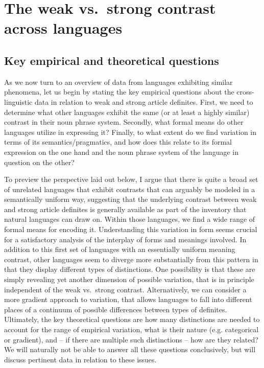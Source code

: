 \documentclass[output=paper
,modfonts
,nonflat]{langscibook}
\begin{document}
\section{The weak vs.\ strong contrast across languages}

\subsection{Key empirical and theoretical questions}

As we now turn to an overview of data from languages exhibiting
similar phenomena, let us begin by stating the key empirical questions
about the cross-linguistic data in relation to weak and strong article
definites. First, we need to determine what other languages exhibit
the same (or at least a highly similar) contrast in their noun phrase
system. Secondly, what formal means do other languages utilize in
expressing it? Finally, to what extent do we find variation
in terms of its semantics/pragmatics, and how does this
relate to its formal expression on the one hand and
the noun phrase system of the language in question on the other?

To preview the perspective laid out below, I argue that there is
quite a broad set of unrelated languages that exhibit contrasts that
can arguably be modeled in a semantically uniform way, suggesting that the underlying
contrast between weak and strong article definites is generally
available as part of the inventory that natural languages can draw on. Within those languages, we
find a wide range of formal means for encoding it. Understanding this variation in form seems crucial for a
satisfactory analysis of the interplay of forms and meanings involved. In addition to this first set of languages with an essentially
uniform meaning contrast, other languages seem to diverge more
substantially from this pattern in that they display different types
of distinctions. One possibility is that these are simply revealing yet
another dimension of possible variation, that is in principle
independent of the weak vs.\ strong contrast. Alternatively, we can
consider a more gradient approach to variation, that allows languages
to fall into different places of a continuum of possible 
differences between types of definites. Ultimately, the key theoretical
questions are how many distinctions are needed to account for the range
of empirical variation, what is their nature (e.g. categorical or
gradient), and -- if there are multiple such distinctions -- how are
they related? We will naturally not be able to answer all these
questions conclusively, but will discuss pertinent data in relation to
these issues.
\end{document}
